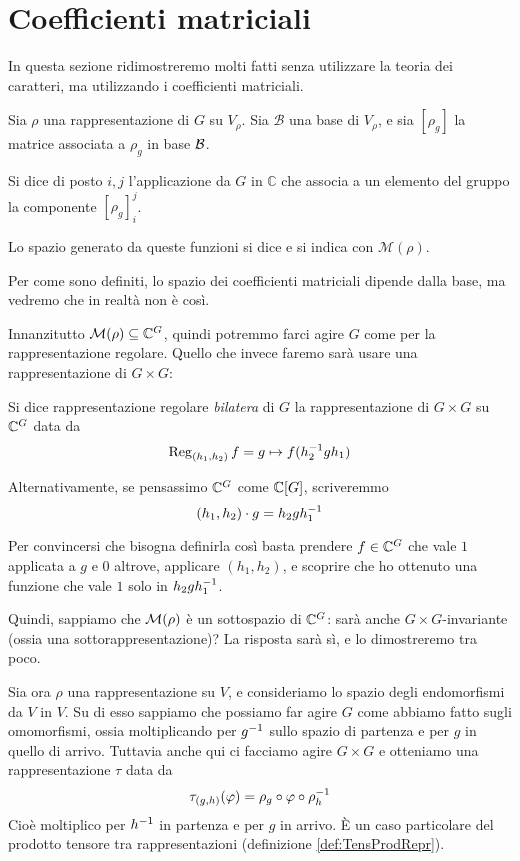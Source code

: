 \section{Coefficienti matriciali}\label{sec:MatEl}
	In questa sezione ridimostreremo molti fatti senza utilizzare la teoria dei caratteri, ma utilizzando i coefficienti matriciali.
	
	\begin{mydef}
		Sia $\rho$ una rappresentazione di $G$ su $V_\rho$. Sia $\mathcal B$ una base di $V_\rho$, e sia $[\rho_g]$ la matrice associata a $\rho_g$ in base $\mathcal B$.
		
		Si dice  di posto $i,j$ l'applicazione da $G$ in $\mathbb C$ che associa a un elemento del gruppo la componente $[\rho_g]_i^j$.
		
		Lo spazio generato da queste funzioni si dice  e si indica con $\mathcal M(\rho)$.
	\end{mydef}
	
	Per come sono definiti, lo spazio dei coefficienti matriciali dipende dalla base, ma vedremo che in realtà non è così.
	
	Innanzitutto $\mathcal M(\rho) \subseteq \mathbb C^{G}$, quindi potremmo farci agire $G$ come per la rappresentazione regolare. Quello che invece faremo sarà usare una rappresentazione di $G\times G$:
	
	\begin{mydef}\label{def:BilReg}
		Si dice rappresentazione regolare \emph{bilatera} di $G$ la rappresentazione di $G \times G$ su $\mathbb C^{G}$ data da
		\[
			\operatorname{Reg}_{(h_1,h_2)}f = g \mapsto f(h_2^{-1} g h_1)
		\]
		
		Alternativamente, se pensassimo $\mathbb C^{G}$ come $\mathbb C[G]$, scriveremmo
		\[
			(h_1,h_2)\cdot g = h_2gh_1^{-1}
		\]

	\end{mydef}
	Per convincersi che bisogna definirla così basta prendere $f\in\mathbb C^{G}$ che vale $1$ applicata a $g$ e $0$ altrove, applicare $(h_1,h_2)$, e scoprire che ho ottenuto una funzione che vale $1$ solo in $h_2gh_1^{-1}$.
	
	Quindi, sappiamo che $\mathcal M(\rho)$ è un sottospazio di $\mathbb C^{G}$: sarà anche $G\times G$-invariante (ossia una sottorappresentazione)? La risposta sarà sì, e lo dimostreremo tra poco.

	Sia ora $\rho$ una rappresentazione su $V$, e consideriamo lo spazio degli endomorfismi da $V$ in $V$. Su di esso sappiamo che possiamo far agire $G$ come abbiamo fatto sugli omomorfismi, ossia moltiplicando per $g^{-1}$ sullo spazio di partenza e per $g$ in quello di arrivo. Tuttavia anche qui ci facciamo agire $G\times G$ e otteniamo una rappresentazione $\tau$ data da
	\[
		\tau_{(g,h)} (\varphi) = \rho_g \circ \varphi \circ \rho_h^{-1}
	\]
	Cioè moltiplico per $h^{-1}$ in partenza e per $g$ in arrivo. \`E un caso particolare del prodotto tensore tra rappresentazioni (definizione \ref{def:TensProdRepr}).
	
